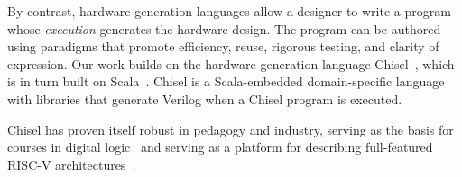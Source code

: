 \documentclass[sigplan,anonymous,review]{acmart}
\begin{document}
By contrast, hardware-generation languages allow a designer to write a program whose \emph{execution} generates the hardware design. The program can be authored using para\-digms that promote efficiency, reuse, rigorous testing, and clarity of expression. Our work builds on the hardware-generation language Chisel~\cite{chisel:book}, which is in turn built on Scala~\cite{scala-overview-tech-report}. Chisel is a Scala-embedded domain-specific language with libraries that generate Verilog when a Chisel program is executed.


Chisel has proven itself robust in pedagogy and industry, serving as the basis for courses in digital logic~\cite{vlsicourse} and serving as a platform for describing full-featured RISC-V architectures~\cite{chisel:riscv}.  
\end{document}
